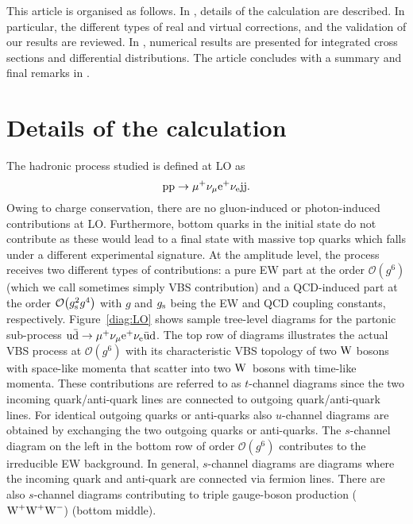 \documentclass[a4article,11pt]{article}
\begin{document}
This article is organised as follows. In ,
details of the calculation are described. In particular, the different
types of real and virtual corrections, and the 
validation of our results
are reviewed.  In , 
numerical results are presented for integrated cross sections and
differential distributions.  The article concludes with a
summary and final remarks in .

\section{Details of the calculation}
\label{sec:calculation}

The hadronic process studied is defined  at LO as
%
\begin{equation}
 \text{p}\text{p}\to\mu^+\nu_\mu\text{e}^+\nu_{\text{e}}\text{j}\text{j} .\label{eq:LOhadproc}
\end{equation}
%
Owing to charge conservation, there are no gluon-induced or
photon-induced contributions at LO. Furthermore, bottom quarks in the
initial state do not contribute as these would lead to a final state
with massive top quarks which falls under a different experimental
signature.  At the amplitude level, the process receives two different
types of contributions: a pure EW part at the order
$\mathcal{O}{\left(g^{6}\right)}$ (which we call sometimes simply VBS
contribution) and a QCD-induced part at the order
$\mathcal{O}{\left(g_{\rm s}^2 g^{4}\right)}$ with $g$ and $g_{\rm s}$
being the EW and QCD coupling constants, respectively.
Figure~\ref{diag:LO} shows sample tree-level diagrams for the partonic
sub-process $\text{u}\bar{\text{d}}\to\mu^+\nu_\mu\text{e}^+\nu_{\text{e}}\bar{\text{u}}\text{d}$.  The
top row of diagrams illustrates the actual VBS process at
$\mathcal{O}{\left(g^{6}\right)}$ with its characteristic VBS topology
of two $\text{W}$ bosons 
with space-like momenta
 that scatter into two
$\text{W}$~bosons 
with time-like momenta.
These contributions are referred to as $t$-channel diagrams since the
two incoming quark/anti-quark lines are connected to outgoing
quark/anti-quark lines.  For identical outgoing quarks or anti-quarks
also $u$-channel diagrams are obtained by exchanging the two outgoing
quarks or anti-quarks.  The $s$-channel diagram on the left in the
bottom row of order $\mathcal{O}{\left(g^{6}\right)}$ contributes to
the irreducible EW background.  In general, $s$-channel diagrams are
diagrams where the incoming quark and anti-quark are connected via
fermion lines.  There are also $s$-channel diagrams contributing to
triple gauge-boson production ($\text{W}^+\text{W}^+\text{W}^-$) (bottom middle).
\end{document}
